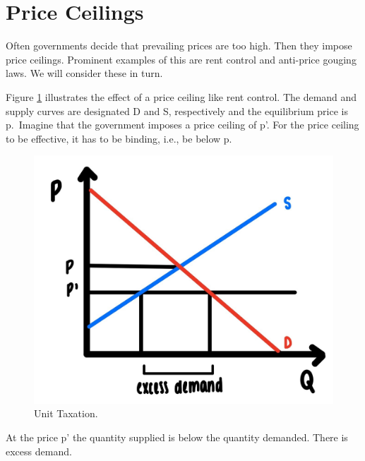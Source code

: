 \documentclass[
]{book}
\begin{document}
\hypertarget{price-ceilings}{%
\section{Price Ceilings}\label{price-ceilings}}

Often governments decide that prevailing prices are too high. Then they impose price ceilings. Prominent examples of this are rent control and anti-price gouging laws. We will consider these in turn.

Figure \ref{fig:fig504} illustrates the effect of a price ceiling like rent control. The demand and supply curves are designated D and S, respectively and the equilibrium price is p.~Imagine that the government imposes a price ceiling of p'. For the price ceiling to be effective, it has to be binding, i.e., be below p.

\begin{figure}

{\centering \includegraphics[width=0.5\linewidth]{img/ch5/fig4} 

}

\caption{Unit Taxation.}\label{fig:fig504}
\end{figure}

At the price p' the quantity supplied is below the quantity demanded. There is excess demand.
\end{document}
